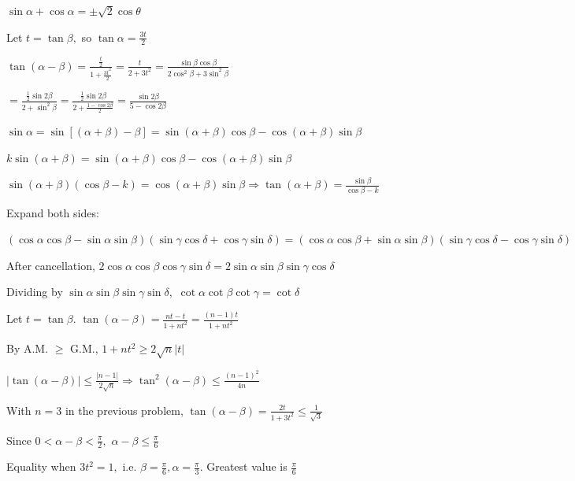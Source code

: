   $\sin\alpha + \cos\alpha = \pm\sqrt{2}\cos\theta$

\item Let $t = \tan\beta,$ so $\tan\alpha = \frac{3t}{2}$

  $\tan(\alpha - \beta) = \frac{\frac{t}{2}}{1 + \frac{3t^2}{2}} = \frac{t}{2 + 3t^2} = \frac{\sin\beta\cos\beta}{2\cos^2\beta +
  3\sin^2\beta}$

  $= \frac{\frac{1}{2}\sin 2\beta}{2 + \sin^2\beta} = \frac{\frac{1}{2}\sin 2\beta}{2 + \frac{1 - \cos 2\beta}{2}} =
  \frac{\sin 2\beta}{5 - \cos 2\beta}$

\item $\sin\alpha = \sin[(\alpha + \beta) - \beta] = \sin(\alpha + \beta)\cos\beta - \cos(\alpha + \beta)\sin\beta$

  $k\sin(\alpha + \beta) = \sin(\alpha + \beta)\cos\beta - \cos(\alpha + \beta)\sin\beta$

  $\sin(\alpha + \beta)(\cos\beta - k) = \cos(\alpha + \beta)\sin\beta \Rightarrow \tan(\alpha + \beta) =
  \frac{\sin\beta}{\cos\beta - k}$

\item Expand both sides:

  $(\cos\alpha\cos\beta - \sin\alpha\sin\beta)(\sin\gamma\cos\delta + \cos\gamma\sin\delta) = (\cos\alpha\cos\beta +
  \sin\alpha\sin\beta)(\sin\gamma\cos\delta - \cos\gamma\sin\delta)$

  After cancellation, $2\cos\alpha\cos\beta\cos\gamma\sin\delta = 2\sin\alpha\sin\beta\sin\gamma\cos\delta$

  Dividing by $\sin\alpha\sin\beta\sin\gamma\sin\delta,$ $\cot\alpha\cot\beta\cot\gamma = \cot\delta$

\item Let $t = \tan\beta.$ $\tan(\alpha - \beta) = \frac{nt - t}{1 + nt^2} = \frac{(n - 1)t}{1 + nt^2}$

  By A.M. $\geq$ G.M., $1 + nt^2 \geq 2\sqrt{n}|t|$

  $|\tan(\alpha - \beta)| \leq \frac{|n - 1|}{2\sqrt{n}} \Rightarrow \tan^2(\alpha - \beta) \leq \frac{(n -
  1)^2}{4n}$

\item With $n = 3$ in the previous problem, $\tan(\alpha - \beta) = \frac{2t}{1 + 3t^2} \leq \frac{1}{\sqrt{3}}$

  Since $0 < \alpha - \beta < \frac{\pi}{2},$ $\alpha - \beta \leq \frac{\pi}{6}$

  Equality when $3t^2 = 1,$ i.e. $\beta = \frac{\pi}{6}, \alpha = \frac{\pi}{3}.$ Greatest value is $\frac{\pi}{6}$

